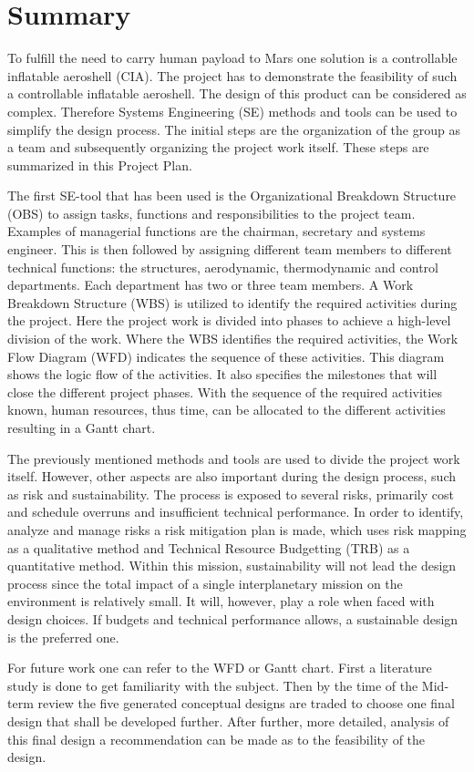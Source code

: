 \section*{Summary}\label{cha:summary}
To fulfill the need to carry human payload to Mars one solution is a controllable inflatable aeroshell (CIA). The project has to demonstrate the feasibility of such a controllable inflatable aeroshell. The design of this product can be considered as complex. Therefore Systems Engineering (SE) methods and tools can be used to simplify the design process. The initial steps are the organization of the group as a team and subsequently organizing the project work itself. These steps are summarized in this Project Plan.

The first SE-tool that has been used is the Organizational Breakdown Structure (OBS) to assign tasks, functions and responsibilities to the project team. Examples of managerial functions are the chairman, secretary and systems engineer. This is then followed by assigning different team members to different technical functions: the structures, aerodynamic, thermodynamic and control departments. Each department has two or three team members. A Work Breakdown Structure (WBS) is utilized to identify the required activities during the project. Here the project work is divided into phases to achieve a high-level division of the work. Where the WBS identifies the required activities, the Work Flow Diagram (WFD) indicates the sequence of these activities. This diagram shows the logic flow of the activities. It also specifies the milestones that will close the different project phases. With the sequence of the required activities known, human resources, thus time, can be allocated to the different activities resulting in a Gantt chart. 

The previously mentioned methods and tools are used to divide the project work itself. However, other aspects are also important during the design process, such as risk and sustainability. The process is exposed to several risks, primarily cost and schedule overruns and insufficient technical performance. In order to identify, analyze and manage risks a risk mitigation plan is made, which uses risk mapping as a qualitative method and Technical Resource Budgetting (TRB) as a quantitative method. Within this mission, sustainability will not lead the design process since the total impact of a single interplanetary mission on the environment is relatively small. It will, however, play a role when faced with design choices. If budgets and technical performance allows, a sustainable design is the preferred one.

For future work one can refer to the WFD or Gantt chart. First a literature study is done to get familiarity with the subject. Then by the time of the Mid-term review the five generated conceptual designs are traded to choose one final design that shall be developed further. After further, more detailed, analysis of this final design a recommendation can be made as to the feasibility of the design.

